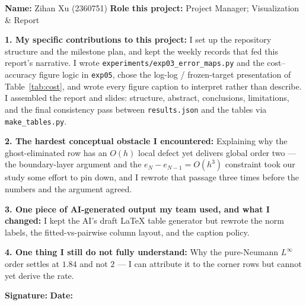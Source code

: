 \documentclass[11pt,a4paper]{article}
\begin{document}
\begin{formbox}
\textbf{Name:} Zihan Xu (2360751)
\textbf{Role this project:} Project Manager; Visualization \& Report

\textbf{1. My specific contributions to this project:}
I set up the repository structure and the milestone plan, and kept the
weekly records that fed this report's narrative.  I wrote
\texttt{experiments/exp03\_error\_maps.py} and the cost--accuracy figure
logic in \texttt{exp05}, chose the log-log / frozen-target presentation
of Table~\ref{tab:cost}, and wrote every figure caption to interpret
rather than describe.  I assembled the report and slides: structure,
abstract, conclusions, limitations, and the final consistency pass
between \texttt{results.json} and the tables via
\texttt{make\_tables.py}.

\textbf{2. The hardest conceptual obstacle I encountered:}
Explaining why the ghost-eliminated row has an $O(h)$ local defect yet
delivers global order two --- the boundary-layer argument and the
$e_N - e_{N-1} = O(h^3)$ constraint took our study some effort to pin
down, and I rewrote that passage three times before the numbers and the
argument agreed.

\textbf{3. One piece of AI-generated output my team used, and what I
changed:}
I kept the AI's draft \LaTeX{} table generator but rewrote the norm
labels, the fitted-vs-pairwise column layout, and the caption policy.

\textbf{4. One thing I still do not fully understand:}
Why the pure-Neumann $L^\infty$ order settles at $1.84$ and not $2$ ---
I can attribute it to the corner rows but cannot yet derive the rate.

\textbf{Signature:} \underline{\hspace{4cm}} \quad \textbf{Date:}
\underline{\hspace{2cm}}
\end{formbox}
\end{document}
